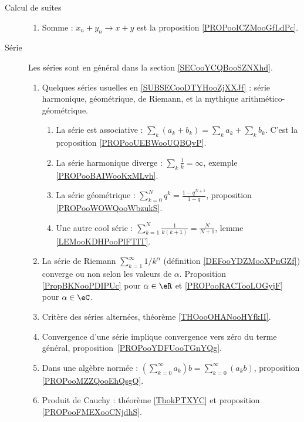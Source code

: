 \begin{description}
	\item[Calcul de suites]
	      \begin{enumerate}
		      \item
		            Somme : \( x_n+y_n\to x+y\) est la proposition \ref{PROPooICZMooGfLdPc}.
	      \end{enumerate}
	\item[Série]
	      Les séries sont en général dans la section \ref{SECooYCQBooSZNXhd}.
	      \begin{enumerate}
		      \item
		            Quelques séries usuelles en \ref{SUBSECooDTYHooZjXXJf} : série harmonique, géométrique, de Riemann, et la mythique arithmético-géométrique.
		            \begin{enumerate}
			            \item
			                  La série est associative : \( \sum_k(a_k+b_k)=\sum_ka_k+\sum_kb_k\). C'est la proposition \ref{PROPooUEBWooUQBQvP}.
			            \item
			                  La série harmonique diverge : \( \sum_k\frac{1}{ k }=\infty\), exemple \ref{PROPooBAIWooKxMLvh}.
			            \item
			                  La série géométrique : \( \sum_{k=0}^Nq^k=\frac{ 1-q^{N+1} }{ 1-q }\), proposition \ref{PROPooWOWQooWbzukS}.
			            \item
			                  Une autre cool série : \( \sum_{k=1}^N\frac{ 1 }{ k(k+1) }=\frac{ N }{ N+1 }\), lemme \ref{LEMooKDHPooPlFTIT}.
		            \end{enumerate}
		      \item
		            La série de Riemann \( \sum_{k=1}^{\infty}1/k^{\alpha}\) (définition \ref{DEFooYDZMooXPnGZf}) converge ou non selon les valeurs de \( \alpha\). Proposition \ref{PropBKNooPDIPUc} pour \( \alpha\in \eR\) et \ref{PROPooRACTooLOGyjF} pour \( \alpha\in \eC\).
		      \item
		            Critère des séries alternées, théorème \ref{THOooOHANooHYfkII}.
		      \item
		            Convergence d'une série implique convergence vers zéro du terme général, proposition~\ref{PROPooYDFUooTGnYQg}.
		      \item
		            Dans une algèbre normée : \( (\sum_{k=0}^{\infty}a_k)b=\sum_{k=0}^{\infty}(a_kb)\), proposition \ref{PROPooMZZQooEhQsgQ}.
		      \item
		            Produit de Cauchy : théorème \ref{ThokPTXYC} et proposition \ref{PROPooFMEXooCNjdhS}.
	      \end{enumerate}


\end{description}
